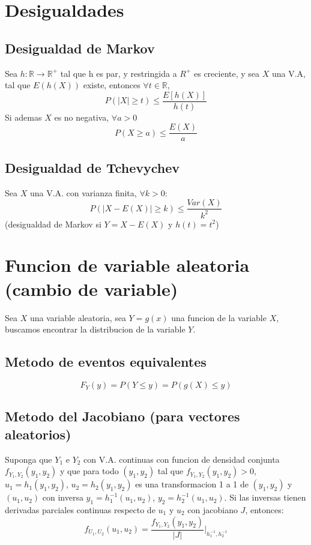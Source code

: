 \documentclass[titlepage,a4paper]{article}
\begin{document}
\section{Desigualdades}
\subsection{Desigualdad de Markov}
Sea $h: \mathbb{R} \rightarrow \mathbb{R}^{+}$ tal que h es par, y restringida a $R^{+}$ es creciente, y sea $X$ una V.A, tal que $E(h(X))$ existe,
entonces $\forall t \in \mathbb{R}$,
\begin{equation*}
    P(|X| \geq t) \leq \frac{E[h(X)]}{h(t)}
\end{equation*}
Si ademas $X$ es no negativa, $\forall a > 0$
\begin{equation*}
    P(X \geq a) \leq \frac{E(X)}{a}
\end{equation*}
\subsection{Desigualdad de Tchevychev}
Sea $X$ una V.A. con varianza finita, $\forall k > 0$:
\begin{equation*}
    P(|X - E(X)| \geq k) \leq \frac{Var(X)}{k^{2}}
\end{equation*}
(desigualdad de Markov si $Y = X-E(X)$ y $h(t) = t^{2}$)
\section{Funcion de variable aleatoria (cambio de variable)}
Sea $X$ una variable aleatoria, sea $Y=g(x)$ una funcion de la variable $X$,
buscamos encontrar la distribucion de la variable $Y$.
\subsection{Metodo de eventos equivalentes}
\begin{equation*}
    F_{Y}(y)= P(Y \leq y) = P(g(X) \leq y)
\end{equation*}
\subsection{Metodo del Jacobiano (para vectores aleatorios)}
Suponga que $Y_{1}$ e $Y_{2}$ con V.A. continuas con funcion de densidad conjunta
$f_{Y_{1},Y_{2}}(y_{1},y_{2})$ y que para todo $(y_{1},y_{2})$ tal que 
$f_{Y_{1},Y_{2}}(y_{1},y_{2}) > 0$, $u_{1} = h_{1}(y_{1},y_{2})$, $u_2=h_{2}(y_{1},y_{2})$
es una transformacion 1 a 1 de $(y_{1},y_{2})$ y $(u_{1},u_{2})$ con inversa 
$y_{1}=h_{1}^{-1}(u_{1},u_{2})$, $y_{2}=h_{2}^{-1}(u_{1},u_{2})$. Si las inversas
tienen derivadas parciales continuas respecto de $u_{1}$ y $u_{2}$ con jacobiano $J$,
entonces:
\begin{equation*}
    f_{U_{1},U_{2}}(u_{1},u_{2}) = \frac{f_{Y_{1},Y_{2}}(y_{1},y_{2})}{|J|} \bigg\rvert_{h_{1}^{-1}, h_{2}^{-1}}
\end{equation*}
\end{document}
